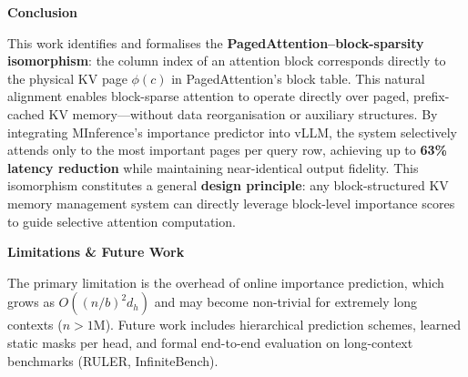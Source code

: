 \documentclass[a0paper]{article}
\renewcommand{\normalsize}{\fontsize{22}{29}\selectfont}
\begin{document}
\begin{conclusionbox}
  {\sffamily\bfseries\fontsize{34}{40}\selectfont\color{white}%
   Conclusion\par}
  \vspace{0.5em}
  {\color{white!93}\normalsize
  This work identifies and formalises the
  \textbf{PagedAttention--block-sparsity isomorphism}: the column
  index of an attention block corresponds directly to the physical
  KV page $\phi(c)$ in PagedAttention's block table. This natural
  alignment enables block-sparse attention to operate directly over
  paged, prefix-cached KV memory---without data reorganisation or
  auxiliary structures. By integrating MInference's importance
  predictor into vLLM, the system selectively attends only to the
  most important pages per query row, achieving up to
  \textbf{63\% latency reduction} while maintaining near-identical
  output fidelity. This isomorphism constitutes a general
  \textbf{design principle}: any block-structured KV memory
  management system can directly leverage block-level importance
  scores to guide selective attention computation.\par}

  \vspace{0.6em}
  {\sffamily\bfseries\fontsize{28}{34}\selectfont\color{MutedGold}%
   Limitations \& Future Work\par}
  \vspace{0.35em}
  {\color{white!85}\normalsize
  The primary limitation is the overhead of online importance
  prediction, which grows as $O((n/b)^2 d_h)$ and may become
  non-trivial for extremely long contexts ($n > 1\text{M}$).
  Future work includes hierarchical prediction schemes, learned
  static masks per head, and formal end-to-end evaluation on
  long-context benchmarks (RULER, InfiniteBench).\par}
\end{conclusionbox}
\end{document}
